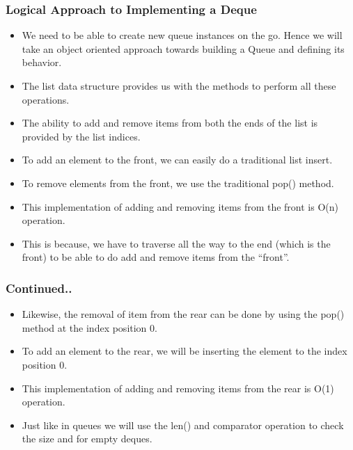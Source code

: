 \documentclass{beamer}
\begin{document}
\begin{frame}
\frametitle{Logical Approach to Implementing a Deque}
\begin{itemize}

\item We need to be able to create new queue instances on the go. Hence we will take an object oriented approach towards building a Queue and defining its behavior.

\item The list data structure provides us with the methods to perform all these operations.

\item The ability to add and remove items from both the ends of the list is provided by the list indices.

\item To add an element to the front, we can easily do a traditional list insert.

\item To remove elements from the front, we use the traditional pop() method.

\item This implementation of adding and removing items from the front is O(n) operation.

\item This is because, we have to traverse all the way to the end (which is the front) to be able to do add and remove items from the “front”.


\end{itemize}
\end{frame}


\begin{frame}
\frametitle{Continued..}
\begin{itemize}

\item Likewise, the removal of item from the rear can be done by using the pop() method at the index position 0.

\item To add an element to the rear, we will be inserting the element to the index position 0.

\item This implementation of adding and removing items from the rear is O(1) operation.

\item Just like in queues we will use the len() and comparator operation to check the size and for empty deques.

\end{itemize}
\end{frame}
\end{document}
